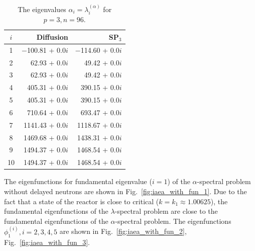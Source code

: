 \documentclass[authoryear]{elsarticle}
\begin{document}
\begin{table}[h]
\caption{The eigenvalues $\alpha_i=\lambda_i^{(\alpha)}$ for $p=3, n=96$.}
\label{tab:iaea_with_alpha_10}
\begin{center}
\begin{tabular}{c r r}
\hline
$i$ & Diffusion & SP$_3$ \\
\hline
1 &$-$100.81 + 0.0$i$&$-$114.60 + 0.0$i$ \\
2 &  62.93 + 0.0$i$& 49.42 + 0.0$i$ \\
3 &  62.93 + 0.0$i$& 49.42 + 0.0$i$ \\
4 & 405.31 + 0.0$i$&390.15 + 0.0$i$ \\
5 & 405.31 + 0.0$i$&390.15 + 0.0$i$ \\
6 & 710.64 + 0.0$i$&693.47 + 0.0$i$ \\
7 &1141.43 + 0.0$i$&1118.67 + 0.0$i$ \\
8 &1469.68 + 0.0$i$&1438.31 + 0.0$i$ \\
9 &1494.37 + 0.0$i$&1468.54 + 0.0$i$ \\
10&1494.37 + 0.0$i$&1468.54 + 0.0$i$ \\
\hline
\end{tabular}
\end{center}
\end{table}

The eigenfunctions for fundamental eigenvalue ($i=1$) of the $\alpha$-spectral problem without delayed neutrons are shown in Fig.~\ref{fig:iaea_with_fun_1}. 
Due to the fact that a state of the reactor is close to critical ($k=k_1\approx 1.00625$), the fundamental eigenfunctions of the $\lambda$-spectral problem are close to the fundamental eigenfunctions of the $\alpha$-spectral problem.
The eigenfunctions $\phi_1^{(i)}, i=2,3,4,5$ are shown in Fig.~\ref{fig:iaea_with_fun_2}, Fig.~\ref{fig:iaea_with_fun_3}.
\end{document}
